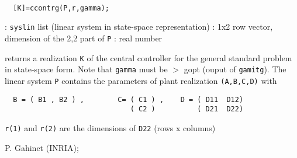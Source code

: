 \begin{mandesc}
   \\ %
\end{mandesc}
\begin{calling_sequence}
\begin{verbatim}
  [K]=ccontrg(P,r,gamma);  
\end{verbatim}
\end{calling_sequence}
\begin{parameters}
  \begin{varlist}
    : \verb!syslin! list (linear system in state-space representation)
    : 1x2 row vector, dimension of the 2,2 part of \verb!P!
    : real number
  \end{varlist}
\end{parameters}
\begin{mandescription}
  returns a realization \verb!K! of the central controller for the
  general standard problem in state-space form.
  Note that \verb!gamma! must be $>$ gopt (ouput of \verb!gamitg!).
  The linear system \verb!P! contains the parameters of plant realization \verb!(A,B,C,D)!
  with
\begin{verbatim}
  B = ( B1 , B2 ) ,        C= ( C1 ) ,    D = ( D11  D12)
                              ( C2 )          ( D21  D22)
\end{verbatim}
\verb!r(1)! and \verb!r(2)! are the dimensions of \verb!D22! (rows x columns)
\end{mandescription}
\begin{manseealso}
     
\end{manseealso}
\begin{authors}
  P. Gahinet (INRIA);   
\end{authors}
